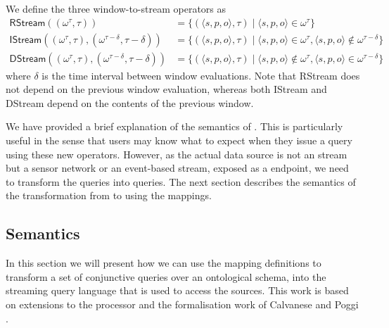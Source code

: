 We define the three window-to-stream operators as
\begin{align*}
  \textsf{RStream}((\omega^\tau, \tau)) &= \{(\langle s, p, o \rangle, \tau) \mid \langle s, p, o \rangle \in \omega^\tau\}\\
%
  \textsf{IStream}((\omega^\tau, \tau), (\omega^{\tau-\delta}, \tau - \delta)) &= \{(\langle s, p, o \rangle, \tau) \mid \langle s, p, o \rangle \in \omega^\tau, \langle s, p, o \rangle \notin \omega^{\tau-\delta}\}\\
%
  \textsf{DStream}((\omega^\tau, \tau), (\omega^{\tau-\delta}, \tau - \delta)) &= \{(\langle s, p, o \rangle, \tau) \mid \langle s, p, o \rangle \notin \omega^\tau, \langle s, p, o \rangle \in \omega^{\tau-\delta}\}
\end{align*}
where $\delta$ is the time interval between window evaluations.
Note that \textsf{RStream} does not depend on the previous window evaluation, whereas both \textsf{IStream} and \textsf{DStream} depend on the contents of the previous window.

We have provided a brief explanation of the semantics of \sparqlstr. 
This is particularly useful in the sense that users may know what to expect when they issue a query using these new operators. 
However, as the actual data source is not an \rdf stream but a sensor network or an event-based stream, \eg exposed as a \sneeql endpoint, we need to transform the \sparqlstr queries into \sneeql queries.
The next section describes the semantics of the transformation from \sparqlstr to \sneeql using the \stwoo mappings.


\subsection{\stwoo Semantics}
\label{mappingsemantics}

In this section we will present how we can use the \stwoo mapping definitions to transform a set of conjunctive queries over an ontological schema, into the streaming query language \sneeql that is used to access the sources. 
This work is based on extensions to the \odemapster processor \cite{Barrasa_04} and the
formalisation work of Calvanese \etal \cite{Calvanese_05} and Poggi \etal \cite{Poggi_08}.

